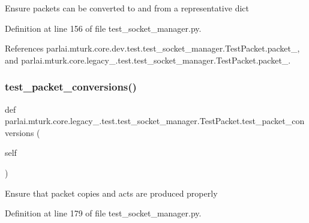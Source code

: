 \begin{DoxyVerb}Ensure packets can be converted to and from a representative dict\end{DoxyVerb}
 

Definition at line 156 of file test\+\_\+socket\+\_\+manager.\+py.



References parlai.\+mturk.\+core.\+dev.\+test.\+test\+\_\+socket\+\_\+manager.\+Test\+Packet.\+packet\+\_, and parlai.\+mturk.\+core.\+legacy\+\_.\+test.\+test\+\_\+socket\+\_\+manager.\+Test\+Packet.\+packet\+\_.

\mbox{\label{classparlai_1_1mturk_1_1core_1_1legacy__2018_1_1test_1_1test__socket__manager_1_1TestPacket_a414a200c5af18b65d2947fdcc3dddb1d}} 
\subsubsection{\texorpdfstring{test\+\_\+packet\+\_\+conversions()}{test\_packet\_conversions()}}
{\footnotesize\ttfamily def parlai.\+mturk.\+core.\+legacy\+\_.\+test.\+test\+\_\+socket\+\_\+manager.\+Test\+Packet.\+test\+\_\+packet\+\_\+conversions (\begin{DoxyParamCaption}\item[{}]{self }\end{DoxyParamCaption})}

\begin{DoxyVerb}Ensure that packet copies and acts are produced properly\end{DoxyVerb}
 

Definition at line 179 of file test\+\_\+socket\+\_\+manager.\+py.



